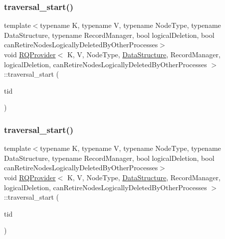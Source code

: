 \mbox{\label{classRQProvider_a96fe481c7ba6b30efbd90ac1eca1e788}} 
\subsubsection{\texorpdfstring{traversal\+\_\+start()}{traversal\_start()}\hspace{0.1cm}{\footnotesize\ttfamily [4/5]}}
{\footnotesize\ttfamily template$<$typename K, typename V, typename Node\+Type, typename Data\+Structure, typename Record\+Manager, bool logical\+Deletion, bool can\+Retire\+Nodes\+Logically\+Deleted\+By\+Other\+Processes$>$ \\
void \hyperlink{classRQProvider}{R\+Q\+Provider}$<$ K, V, Node\+Type, \hyperlink{classDataStructure}{Data\+Structure}, Record\+Manager, logical\+Deletion, can\+Retire\+Nodes\+Logically\+Deleted\+By\+Other\+Processes $>$\+::traversal\+\_\+start (\begin{DoxyParamCaption}\item[{const int}]{tid }\end{DoxyParamCaption})\hspace{0.3cm}{\ttfamily [inline]}}

\mbox{\label{classRQProvider_a96fe481c7ba6b30efbd90ac1eca1e788}} 
\subsubsection{\texorpdfstring{traversal\+\_\+start()}{traversal\_start()}\hspace{0.1cm}{\footnotesize\ttfamily [5/5]}}
{\footnotesize\ttfamily template$<$typename K, typename V, typename Node\+Type, typename Data\+Structure, typename Record\+Manager, bool logical\+Deletion, bool can\+Retire\+Nodes\+Logically\+Deleted\+By\+Other\+Processes$>$ \\
void \hyperlink{classRQProvider}{R\+Q\+Provider}$<$ K, V, Node\+Type, \hyperlink{classDataStructure}{Data\+Structure}, Record\+Manager, logical\+Deletion, can\+Retire\+Nodes\+Logically\+Deleted\+By\+Other\+Processes $>$\+::traversal\+\_\+start (\begin{DoxyParamCaption}\item[{const int}]{tid }\end{DoxyParamCaption})\hspace{0.3cm}{\ttfamily [inline]}}

